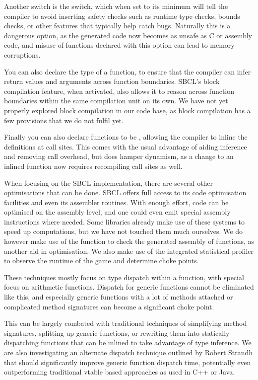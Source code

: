 \documentclass[a4paper]{paper}
\begin{document}
Another switch is the  switch, which when set to its minimum will tell the compiler to avoid inserting safety checks such as runtime type checks, bounds checks, or other features that typically help catch bugs. Naturally this is a dangerous option, as the generated code now becomes as unsafe as C or assembly code, and misuse of functions declared with this option can lead to memory corruptions.

You can also declare the type of a function, to ensure that the compiler can infer return values and arguments across function boundaries. SBCL's block compilation feature, when activated, also allows it to reason across function boundaries within the same compilation unit on its own. We have not yet properly explored block compilation in our code base, as block compilation has a few provisions that we do not fulfil yet.

Finally you can also declare functions to be , allowing the compiler to inline the definitions at call sites. This comes with the usual advantage of aiding inference and removing call overhead, but does hamper dynamism, as a change to an inlined function now requires recompiling call sites as well.

When focusing on the SBCL implementation, there are several other optimisations that can be done. SBCL offers full access to its code optimisation facilities and even its assembler routines. With enough effort, code can be optimised on the assembly level, and one could even emit special assembly instructions where needed. Some libraries already make use of these systems to speed up computations, but we have not touched them much ourselves. We do however make use of the  function to check the generated assembly of functions, as another aid in optimisation. We also make use of the integrated statistical profiler to observe the runtime of the game and determine choke points.

These techniques mostly focus on type dispatch within a function, with special focus on arithmetic functions. Dispatch for generic functions cannot be eliminated like this, and especially generic functions with a lot of methods attached or complicated method signatures can become a significant choke point.

This can be largely combated with traditional techniques of simplifying method signatures, splitting up generic functions, or rewriting them into statically dispatching functions that can be inlined to take advantage of type inference. We are also investigating an alternate dispatch technique outlined by Robert Strandh\cite{strandh2014fast} that should significantly improve generic function dispatch time, potentially even outperforming traditional vtable based approaches as used in C++ or Java.
\end{document}
